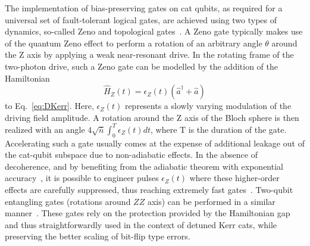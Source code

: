 \documentclass[%
 reprint,
 superscriptaddress,
 amsmath,
 amssymb,
 aps,
 pra,
 10pt
]{revtex4-2}
\newcommand{\nbar}{\bar{n}}
\begin{document}
The implementation of bias-preserving gates on cat qubits, as required for a universal set of fault-tolerant logical gates, are achieved using two types of dynamics, so-called Zeno and topological gates~\cite{Mirrahimi2014,Guillaud2019,Puri2020}. A Zeno gate typically makes use of the quantum Zeno effect to perform a rotation of an arbitrary angle $\theta$ around the Z axis by applying a weak near-resonant drive. In the rotating frame of the two-photon drive, such a Zeno gate can be modelled by the addition of the Hamiltonian 
\begin{equation}
    \hat H_Z(t) = \epsilon_Z(t) (\hat a^\dagger + \hat a)
    \label{eq:Z}
\end{equation}
to Eq.~\eqref{eq:DKerr}. Here, $\epsilon_Z(t)$ represents a slowly varying modulation of the driving field amplitude. A rotation around the Z axis of the Bloch sphere is then realized with an angle $4 \sqrt{\nbar} \int_0^T \epsilon_Z(t) dt$, where T is the duration of the gate. Accelerating such a gate usually comes at the expense of additional leakage out of the cat-qubit subspace due to non-adiabatic effects. In the absence of decoherence, and by benefiting from the adiabatic theorem with exponential accuracy~\cite{teufel:book}, it is possible to engineer pulses $\epsilon_Z(t)$ where these higher-order effects are carefully suppressed, thus reaching extremely fast gates~\cite{Xu2021}. Two-qubit entangling gates (rotations around $ZZ$ axis) can be performed in a similar manner~\cite{Mirrahimi2014}. These gates rely on the protection provided by the Hamiltonian gap and thus straightforwardly used in the context of detuned Kerr cats, while preserving the better scaling of bit-flip type errors.
\end{document}
